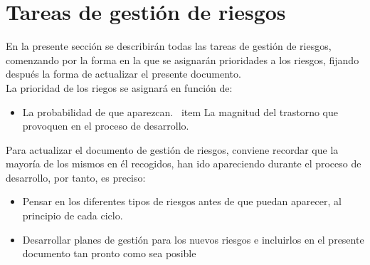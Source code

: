 \chapter{Tareas de gestión de riesgos}
En la presente sección se describirán todas las tareas de gestión de riesgos, comenzando por la forma en la que se asignarán prioridades a los riesgos, fijando después la forma de actualizar el presente documento.\\

La prioridad de los riegos se asignará en función de:

	\begin{itemize}
		\item La probabilidad de que aparezcan.
		\ item La magnitud del trastorno que provoquen en el proceso de desarrollo.
	\end{itemize}
	
Para actualizar el documento de gestión de riesgos, conviene recordar que la mayoría de los mismos en él recogidos, han ido apareciendo durante el proceso de desarrollo, por tanto, es preciso:

	\begin{itemize}
	\item Pensar en los diferentes tipos de riesgos antes de que puedan aparecer, al principio de cada ciclo.
	\item Desarrollar planes de gestión para los nuevos riesgos e incluirlos en el presente documento tan pronto como sea posible
	\end{itemize}